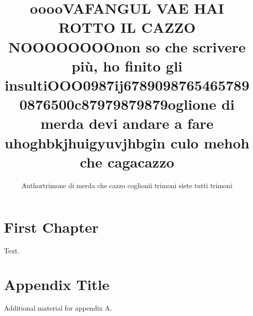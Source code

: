 \documentclass[11pt,a4paper,openright]{book}
\title{ooooVAFANGUL VAE HAI ROTTO IL CAZZO NOOOOOOOOnon so che scrivere più, ho finito gli insultiOOO0987ij67890987654657890876500c87979879879oglione di merda devi andare a fare uhoghbkjhuigyuvjhbgin culo mehoh che cagacazzo}
\author{Authortrimone di merda che cazzo coglionii trimoni siete tutti trimoni}
\date{}
\begin{document}
\maketitle
\tableofcontents


\chapter{First Chapter}
Text. 
\cite{doe2025sample} 


\appendix
\chapter{Appendix Title}
Additional material for appendix A.





\end{document}
